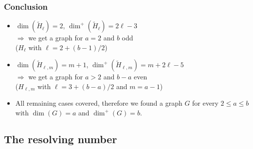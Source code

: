 \documentclass[hyperref={pdfpagelabels=false}]{beamer}
\theoremstyle{definition}
\theoremstyle{theorem}
\begin{document}
\begin{frame}
	\frametitle{Conclusion}
	\begin{itemize}
		\item $\dim(\tilde H_\ell) = 2$, $\dim^+(\tilde H_\ell) = 2\ell - 3$\\
			$\Rightarrow$ we get a graph for $a=2$ and $b$ odd\\
			($H_\ell$ with $\ell = 2+(b-1)/2$)
		\item $\dim(\tilde H_{\ell,m}) = m + 1$, $\dim^+(\tilde H_{\ell,m}) = m + 2\ell - 5$\\
			$\Rightarrow$ we get a graph for $a>2$ and $b-a$ even\\
			($H_{\ell,m}$ with $\ell = 3+(b-a)/2$ and $m=a-1$)
		\item All remaining cases covered, therefore we found a graph $G$ for every $2 \leq a \leq b$ with $\dim(G) = a$ and $\dim^+(G) = b$.
	\end{itemize}
\end{frame}
\subsection{The resolving number}
\end{document}
